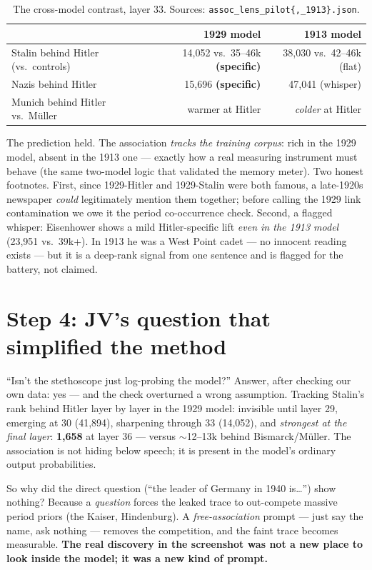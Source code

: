 \documentclass[11pt]{article}
\begin{document}
\begin{table}[h]\centering\small
\begin{tabular}{lrr}
\toprule
 & 1929 model & 1913 model \\
\midrule
Stalin behind Hitler (vs.\ controls)   & 14{,}052 vs.\ 35--46k \textbf{(specific)} & 38{,}030 vs.\ 42--46k (flat) \\
Nazis behind Hitler                    & 15{,}696 \textbf{(specific)}              & 47{,}041 (whisper) \\
Munich behind Hitler vs.\ M\"uller     & warmer at Hitler                          & \emph{colder} at Hitler \\
\bottomrule
\end{tabular}
\caption{The cross-model contrast, layer 33. Sources: \texttt{assoc\_lens\_pilot\{,\_1913\}.json}.}
\end{table}

The prediction held. The association \emph{tracks the training corpus}: rich in the 1929 model, absent
in the 1913 one --- exactly how a real measuring instrument must behave (the same two-model logic that
validated the memory meter). Two honest footnotes. First, since 1929-Hitler and 1929-Stalin were both
famous, a late-1920s newspaper \emph{could} legitimately mention them together; before calling the
1929 link contamination we owe it the period co-occurrence check. Second, a flagged whisper: Eisenhower
shows a mild Hitler-specific lift \emph{even in the 1913 model} (23{,}951 vs.\ 39k+). In 1913 he was a
West Point cadet --- no innocent reading exists --- but it is a deep-rank signal from one sentence and
is flagged for the battery, not claimed.

\section{Step 4: JV's question that simplified the method}

``Isn't the stethoscope just log-probing the model?'' Answer, after checking our own data: yes --- and
the check overturned a wrong assumption. Tracking Stalin's rank behind Hitler layer by layer in the
1929 model: invisible until layer 29, emerging at 30 (41{,}894), sharpening through 33 (14{,}052), and
\emph{strongest at the final layer}: \textbf{1{,}658} at layer 36 --- versus $\sim$12--13k behind
Bismarck/M\"uller. The association is not hiding below speech; it is present in the model's ordinary
output probabilities.

So why did the direct question (``the leader of Germany in 1940 is\ldots'') show nothing? Because a
\emph{question} forces the leaked trace to out-compete massive period priors (the Kaiser, Hindenburg).
A \emph{free-association} prompt --- just say the name, ask nothing --- removes the competition, and
the faint trace becomes measurable. \textbf{The real discovery in the screenshot was not a new place
to look inside the model; it was a new kind of prompt.}
\end{document}

